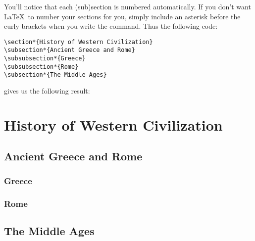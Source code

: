 \documentclass{article}
\begin{document}
You'll notice that each (sub)section is numbered automatically. If you don't want \LaTeX~to number your sections for you, simply include an asterisk before the curly brackets when you write the command. Thus the following code:
\begin{verbatim}
\section*{History of Western Civilization}
\subsection*{Ancient Greece and Rome}
\subsubsection*{Greece}
\subsubsection*{Rome}
\subsection*{The Middle Ages}
\end{verbatim}
gives us the following result: 
\section*{History of Western Civilization}
\subsection*{Ancient Greece and Rome}
\subsubsection*{Greece}
\subsubsection*{Rome}
\subsection*{The Middle Ages}
\end{document}
